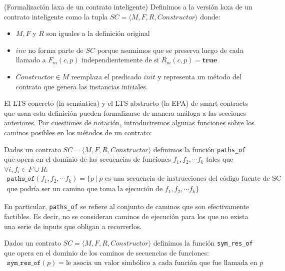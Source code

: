\begin{definition}(Formalización laxa de un contrato inteligente)
    \label{definicion-laxa-smart-contract}
    Definimos a la versión laxa de un contrato inteligente como la tupla $SC = \langle M, F, R, Constructor \rangle$ donde:
    \begin{itemize}
        \item $M, F$ y $R$ son iguales a la definición original
        \item $inv$ no forma parte de $SC$ porque asumimos que se preserva luego de cada llamado a $F_m(c,p)$ independientemente de si $R_m(c,p) = \textbf{true}$
        \item $Constructor \in M$ reemplaza el predicado $init$ y representa un método del contrato que genera las instancias iniciales.
    \end{itemize}
\end{definition}
El LTS concreto (la semántica) y el LTS abstracto (la EPA) de smart contracts que usan esta definición pueden formalizarse de manera análoga a las secciones anteriores.
Por cuestiones de notación, introduciremos algunas funciones sobre los caminos posibles en los métodos de un contrato:
\begin{definition}
    Dados un contrato $SC = \langle M, F, R, Constructor \rangle$ definimos la función \texttt{paths\_of} que opera en el dominio de las secuencias de funciones $f_1, f_2, \cdots f_k$ tales que $\forall i, f_i \in F \cup R$:
    \begin{multline}
        \texttt{paths\_of}(f_1, f_2, \cdots f_k) = \{p \: | \: p \text{ es una secuencia de instrucciones del código fuente de SC} \\
        \text{que podría ser un camino que toma la ejecución de } f_1, f_2, \cdots f_k \}
    \end{multline}
\end{definition}
En particular, \texttt{paths\_of} se refiere al conjunto de caminos que son efectivamente factibles.
Es decir, no se consideran caminos de ejecución para los que no exista una serie de inputs que obligan a recorrerlos.
\begin{definition}
    Dados un contrato $SC = \langle M, F, R, Constructor \rangle$ definimos la función \texttt{sym\_res\_of} que opera en el dominio de los caminos de secuencias de funciones:
    \begin{multline}
        \texttt{sym\_res\_of}(p) = \text{le asocia un valor simbólico a cada función que fue llamada en }p
    \end{multline}
\end{definition}

